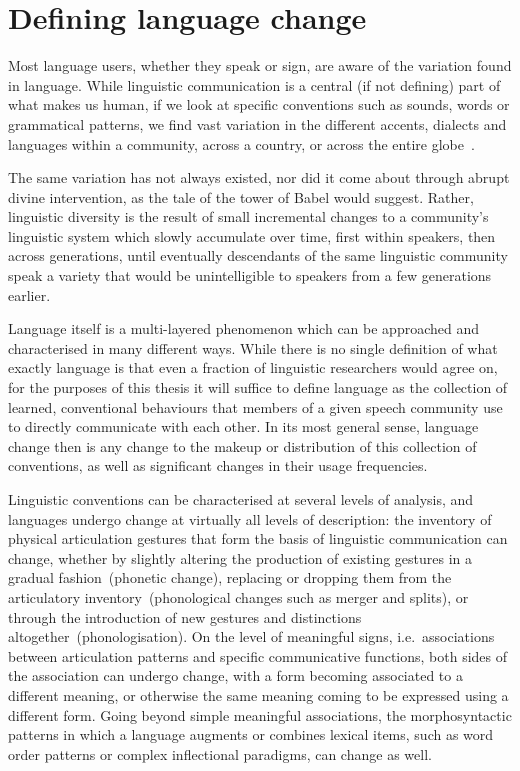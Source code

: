 \section{Defining language change}

Most language users, whether they speak or sign, are aware of the variation found in language. While linguistic communication is a central (if not defining) part of what makes us human, if we look at specific conventions such as sounds, words or grammatical patterns, we find vast variation in the different accents, dialects and languages within a community, across a country, or across the entire globe~\citep{Evans2009}.

The same variation has not always existed, nor did it come about through abrupt divine intervention, as the tale of the tower of Babel would suggest. Rather, linguistic diversity is the result of small incremental changes to a community's linguistic system which slowly accumulate over time, first within speakers, then across generations, until eventually descendants of the same linguistic community speak a variety that would be unintelligible to speakers from a few generations earlier.

Language itself is a multi-layered phenomenon which can be approached and characterised in many different ways. While there is no single definition of what exactly language is that even a fraction of linguistic researchers would agree on, for the purposes of this thesis it will suffice to define language as the collection of learned, conventional behaviours %
that members of a given speech community use to directly communicate with each other. In its most general sense, language change then is any change to the makeup or distribution of this collection of conventions, as well as significant changes in their usage frequencies.

Linguistic conventions can be characterised at several levels of analysis, and languages undergo change at virtually all levels of description: the inventory of physical articulation gestures that form the basis of linguistic communication can change, whether by slightly altering the production of existing gestures in a gradual fashion~(phonetic change), replacing or dropping them from the articulatory inventory~(phonological changes such as merger and splits), or through the introduction of new gestures and distinctions altogether~(phonologisation). On the level of meaningful signs, i.e.~associations between articulation patterns and specific communicative functions, both sides of the association can undergo change, with a form becoming associated to a different meaning, or otherwise the same meaning coming to be expressed using a different form. Going beyond simple meaningful associations, the morphosyntactic patterns in which a language augments or combines lexical items, such as word order patterns or complex inflectional paradigms, can change as well.

